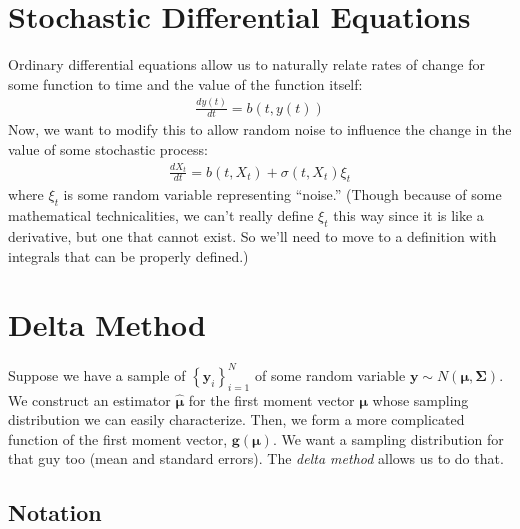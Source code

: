 \documentclass[12pt]{article}
\theoremstyle{plain}
\theoremstyle{definition}
\theoremstyle{remark}
\begin{document}
\section{Stochastic Differential Equations}

Ordinary differential equations allow us to naturally relate rates of
change for some function to time and the value of the function itself:
\begin{align*}
  \frac{dy(t)}{dt} = b(t,y(t))
\end{align*}
Now, we want to modify this to allow random noise to influence the
change in the value of some stochastic process:
\begin{align*}
  \frac{dX_t}{dt} = b(t,X_t) + \sigma(t,X_t) \xi_t
\end{align*}
where $\xi_t$ is some random variable representing ``noise.'' (Though
because of some mathematical technicalities, we can't really define
$\xi_t$ this way since it is like a derivative, but one that cannot
exist. So we'll need to move to a definition with integrals that can be
properly defined.)




\clearpage






\section{Delta Method}

Suppose we have a sample of $\left\{\boldsymbol{y}_i\right\}_{i=1}^N$ of
some random variable $\boldsymbol{y}\sim
N(\boldsymbol{\mu},\boldsymbol{\Sigma})$. We construct an estimator
$\boldsymbol{\hat{\mu}}$ for the first moment vector $\boldsymbol{\mu}$
whose sampling distribution we can easily characterize. Then, we form a
more complicated function of the first moment vector,
$\boldsymbol{g}(\boldsymbol{\mu})$.  We want a sampling distribution for
that guy too (mean and standard errors). The \emph{delta method} allows
us to do that.

\subsection{Notation}
\end{document}
